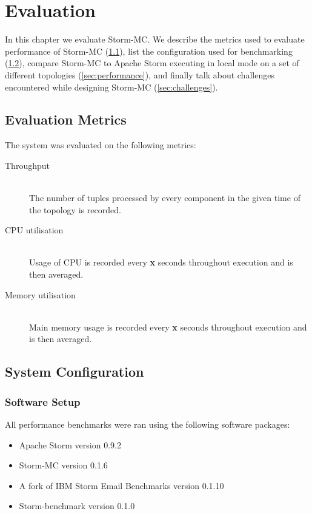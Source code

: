 \chapter{Evaluation}

In this chapter we evaluate Storm-MC. We describe the metrics used to evaluate performance of Storm-MC (\ref{sec:metrics}), list the configuration used for benchmarking (\ref{sec:system_conf}), compare Storm-MC to Apache Storm executing in local mode on a set of different topologies (\ref{sec:performance}), and finally talk about challenges encountered while designing Storm-MC (\ref{sec:challenges}).

\section{Evaluation Metrics}
\label{sec:metrics}

The system was evaluated on the following metrics:

\begin{description}
	\item[Throughput] \hfill \\
	The number of tuples processed by every component in the given time of the topology is recorded.
	\item[CPU utilisation] \hfill \\
	Usage of CPU is recorded every \textbf{x} seconds throughout execution and is then averaged.
	\item[Memory utilisation] \hfill \\
	Main memory usage is recorded every \textbf{x} seconds throughout execution and is then averaged.
\end{description}

\section{System Configuration}
\label{sec:system_conf}

\subsection{Software Setup}

All performance benchmarks were ran using the following software packages:

\begin{itemize}
	\item Apache Storm version 0.9.2
	\item Storm-MC version 0.1.6
	\item A fork of IBM Storm Email Benchmarks version 0.1.10
	\item Storm-benchmark version 0.1.0
\end{itemize}

